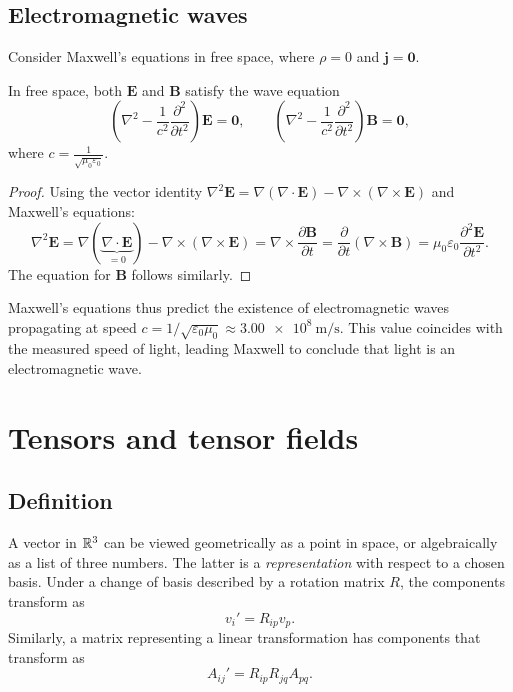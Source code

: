 \documentclass[a4paper]{article}
\begin{document}
\subsection{Electromagnetic waves}
Consider Maxwell's equations in free space, where $\rho = 0$ and $\mathbf{j} = \mathbf{0}$.

\begin{prop}
  In free space, both $\mathbf{E}$ and $\mathbf{B}$ satisfy the wave equation
  \[
    \left(\nabla^2 - \frac{1}{c^2}\frac{\partial^2}{\partial t^2}\right)\mathbf{E} = \mathbf{0}, \qquad \left(\nabla^2 - \frac{1}{c^2}\frac{\partial^2}{\partial t^2}\right)\mathbf{B} = \mathbf{0},
  \]
  where $c = \frac{1}{\sqrt{\mu_0\varepsilon_0}}$.
\end{prop}
\begin{proof}
  Using the vector identity $\nabla^2 \mathbf{E} = \nabla(\nabla\cdot \mathbf{E}) - \nabla\times(\nabla\times \mathbf{E})$ and Maxwell's equations:
  \[
    \nabla^2 \mathbf{E} = \nabla(\underbrace{\nabla\cdot \mathbf{E}}_{=0}) - \nabla\times (\nabla\times \mathbf{E}) = \nabla\times \frac{\partial \mathbf{B}}{\partial t} = \frac{\partial}{\partial t} (\nabla \times \mathbf{B}) = \mu_0\varepsilon_0 \frac{\partial^2 \mathbf{E}}{\partial t^2}.
  \]
  The equation for $\mathbf{B}$ follows similarly.
\end{proof}

\begin{rmk}
  Maxwell's equations thus predict the existence of electromagnetic waves propagating at speed $c = 1/\sqrt{\varepsilon_0 \mu_0} \approx \SI{3.00e8}{\meter\per\second}$. This value coincides with the measured speed of light, leading Maxwell to conclude that light is an electromagnetic wave.
\end{rmk}

\section{Tensors and tensor fields}
\subsection{Definition}
A vector in $\mathbb{R}^3$ can be viewed geometrically as a point in space, or algebraically as a list of three numbers. The latter is a \emph{representation} with respect to a chosen basis. Under a change of basis described by a rotation matrix $R$, the components transform as
\[
  v_i' = R_{ip}v_p.
\]
Similarly, a matrix representing a linear transformation has components that transform as
\[
  A_{ij}' = R_{ip}R_{jq}A_{pq}.
\]
\end{document}
